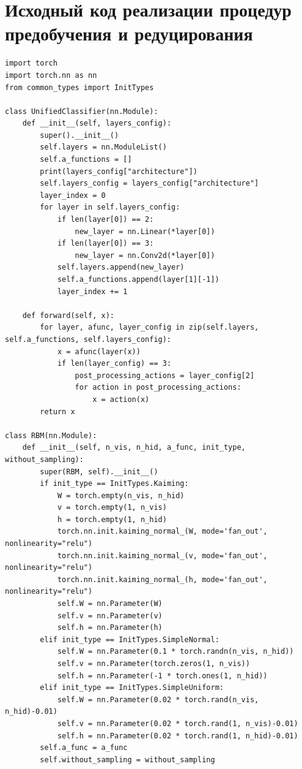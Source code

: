 \chapter{Исходный код реализации процедур предобучения и редуцирования}
\label{app:a}

\begin{lstlisting}[style=PythonStyle]
import torch
import torch.nn as nn
from common_types import InitTypes

class UnifiedClassifier(nn.Module):
    def __init__(self, layers_config):
        super().__init__()
        self.layers = nn.ModuleList()
        self.a_functions = []
        print(layers_config["architecture"])
        self.layers_config = layers_config["architecture"]
        layer_index = 0
        for layer in self.layers_config:
            if len(layer[0]) == 2:
                new_layer = nn.Linear(*layer[0])
            if len(layer[0]) == 3:
                new_layer = nn.Conv2d(*layer[0])
            self.layers.append(new_layer)
            self.a_functions.append(layer[1][-1])
            layer_index += 1

    def forward(self, x):
        for layer, afunc, layer_config in zip(self.layers, self.a_functions, self.layers_config):
            x = afunc(layer(x))
            if len(layer_config) == 3:
                post_processing_actions = layer_config[2]
                for action in post_processing_actions:
                    x = action(x)
        return x

class RBM(nn.Module):
    def __init__(self, n_vis, n_hid, a_func, init_type, without_sampling):
        super(RBM, self).__init__()
        if init_type == InitTypes.Kaiming:
            W = torch.empty(n_vis, n_hid)
            v = torch.empty(1, n_vis)
            h = torch.empty(1, n_hid)
            torch.nn.init.kaiming_normal_(W, mode='fan_out', nonlinearity="relu")
            torch.nn.init.kaiming_normal_(v, mode='fan_out', nonlinearity="relu")
            torch.nn.init.kaiming_normal_(h, mode='fan_out', nonlinearity="relu")
            self.W = nn.Parameter(W)
            self.v = nn.Parameter(v)
            self.h = nn.Parameter(h)
        elif init_type == InitTypes.SimpleNormal:
            self.W = nn.Parameter(0.1 * torch.randn(n_vis, n_hid))
            self.v = nn.Parameter(torch.zeros(1, n_vis))
            self.h = nn.Parameter(-1 * torch.ones(1, n_hid))
        elif init_type == InitTypes.SimpleUniform:
            self.W = nn.Parameter(0.02 * torch.rand(n_vis, n_hid)-0.01)
            self.v = nn.Parameter(0.02 * torch.rand(1, n_vis)-0.01)
            self.h = nn.Parameter(0.02 * torch.rand(1, n_hid)-0.01)
        self.a_func = a_func
        self.without_sampling = without_sampling


\end{lstlisting}
